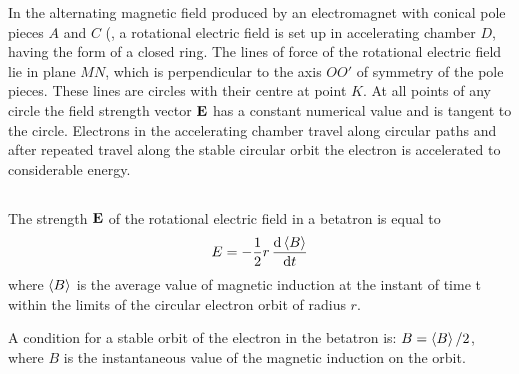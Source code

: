 In the alternating magnetic field produced by an electromagnet with conical pole pieces $A$ and $C$ (, a rotational electric field is set up in accelerating chamber $D$, having the form of a closed ring. The lines of force  of the rotational electric field lie in plane $MN$, which is perpendicular to the axis $OO'$ of symmetry of the pole pieces. These lines are circles with their centre at point $K$. At all points of any circle the field strength vector $\vb{E}$ has a constant numerical value and is tangent to the circle. Electrons in the accelerating chamber travel along circular paths and after repeated travel along the stable circular orbit the electron is accelerated to considerable energy.

\subsection{}\label{27.2.4} The strength $\vb{E}$ of the rotational electric field in a betatron is equal to
\begin{equation*}%
E = -\frac{1}{2} r \, \dv{\expval{B}}{t} 
\end{equation*}
where $\expval{B}$ is the average value of magnetic induction at the instant of time t within the limits of the circular electron orbit of radius $r$.

A condition for a stable orbit of the electron in the betatron is: $B = \expval{B}/2$, where $B$ is the instantaneous value of the magnetic induction on the orbit.

